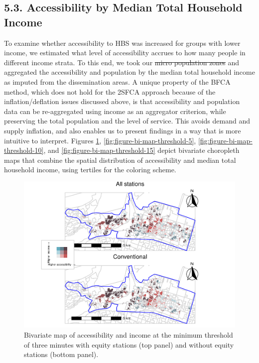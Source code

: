\documentclass[]{elsarticle} %
\providecommand{\DIFaddtex}[1]{{\protect\color{blue}\uwave{#1}}} %
\providecommand{\DIFdeltex}[1]{{\protect\color{red}\sout{#1}}}                      %
\providecommand{\DIFaddbegin}{} %
\providecommand{\DIFaddend}{} %
\providecommand{\DIFdelbegin}{} %
\providecommand{\DIFdelend}{} %
\providecommand{\DIFaddbeginFL}{} %
\providecommand{\DIFaddendFL}{} %
\providecommand{\DIFdelbeginFL}{} %
\providecommand{\DIFdelendFL}{} %
\providecommand{\DIFadd}[1]{\texorpdfstring{\DIFaddtex{#1}}{#1}} %
\providecommand{\DIFdel}[1]{\texorpdfstring{\DIFdeltex{#1}}{}} %
\newcommand{\DIFscaledelfig}{0.5}
\newlength{\DIFdelgraphicswidth} %
\newlength{\DIFdelgraphicsheight} %
\newcommand{\DIFaddincludegraphics}[2][]{{\color{blue}\fbox{\DIFOincludegraphics[#1]{#2}}}} %
\newcommand{\DIFdelincludegraphics}[2][]{%
\sbox{\DIFdelgraphicsbox}{\DIFOincludegraphics[#1]{#2}}%
\settoboxwidth{\DIFdelgraphicswidth}{\DIFdelgraphicsbox} %
\settoboxtotalheight{\DIFdelgraphicsheight}{\DIFdelgraphicsbox} %
\scalebox{\DIFscaledelfig}{%
\parbox[b]{\DIFdelgraphicswidth}{\usebox{\DIFdelgraphicsbox}\\[-\baselineskip] \rule{\DIFdelgraphicswidth}{0em}}\llap{\resizebox{\DIFdelgraphicswidth}{\DIFdelgraphicsheight}{%
\setlength{\unitlength}{\DIFdelgraphicswidth}%
\begin{picture}(1,1)%
\thicklines\linethickness{2pt} %
{\color[rgb]{1,0,0}\put(0,0){\framebox(1,1){}}}%
{\color[rgb]{1,0,0}\put(0,0){\line( 1,1){1}}}%
{\color[rgb]{1,0,0}\put(0,1){\line(1,-1){1}}}%
\end{picture}%
}\hspace*{3pt}}} %
} %
\DeclareRobustCommand{\DIFaddbegin}{\DIFOaddbegin \let\includegraphics\DIFaddincludegraphics} %
\DeclareRobustCommand{\DIFaddend}{\DIFOaddend \let\includegraphics\DIFOincludegraphics} %
\DeclareRobustCommand{\DIFdelbegin}{\DIFOdelbegin \let\includegraphics\DIFdelincludegraphics} %
\DeclareRobustCommand{\DIFdelend}{\DIFOaddend \let\includegraphics\DIFOincludegraphics} %
\DeclareRobustCommand{\DIFaddbeginFL}{\DIFOaddbeginFL \let\includegraphics\DIFaddincludegraphics} %
\DeclareRobustCommand{\DIFaddendFL}{\DIFOaddendFL \let\includegraphics\DIFOincludegraphics} %
\DeclareRobustCommand{\DIFdelbeginFL}{\DIFOdelbeginFL \let\includegraphics\DIFdelincludegraphics} %
\DeclareRobustCommand{\DIFdelendFL}{\DIFOaddendFL \let\includegraphics\DIFOincludegraphics} %
\begin{document}
\hypertarget{accessibility-by-median-total-household-income}{%
\subsection{5.3. Accessibility by Median Total Household
Income}\label{accessibility-by-median-total-household-income}}

To examine whether accessibility to HBS was increased for groups with
lower income, we estimated what level of accessibility accrues to how
many people in different income strata. To this end, we took our \DIFdelbegin \DIFdel{micro
population zones }\DIFdelend \DIFaddbegin \DIFadd{small
population cells }\DIFaddend and aggregated the accessibility and population by the
median total household income as imputed from the dissemination areas. A
unique property of the BFCA method, which does not hold for the 2SFCA
approach because of the inflation/deflation issues discussed above, is
that accessibility and population data can be re-aggregated using income
as an aggregator criterion, while preserving the total population and
the level of service. This avoids demand and supply inflation, and also
enables us to present findings in a way that is more intuitive to
interpret. Figures \ref{fig:figure-bi-map-threshold-3},
\ref{fig:figure-bi-map-threshold-5},
\ref{fig:figure-bi-map-threshold-10}, and
\ref{fig:figure-bi-map-threshold-15} depict bivariate choropleth maps
that combine the spatial distribution of accessibility and median total
household income, using tertiles for the coloring scheme.

\begin{figure}
\DIFdelbeginFL %
\DIFdelendFL \DIFaddbeginFL \includegraphics[width=1.2\linewidth]{Bike-share-spatial-equity_files/figure-latex/figure-bi-map-threshold-3-1} \DIFaddendFL \caption{\label{fig-bivariate-map-threshold-3}Bivariate map of accessibility and income at the minimum threshold of three minutes with equity stations (top panel) and without equity stations (bottom panel).}\label{fig:figure-bi-map-threshold-3}
\end{figure}
\end{document}
